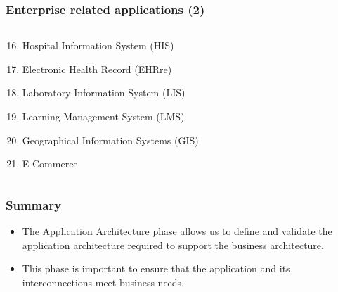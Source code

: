 \documentclass[aspectratio=169, table]{beamer}
\begin{document}
\begin{frame}
    \frametitle{Enterprise related applications (2)}
    \begin{columns}
        \begin{column}{0.5\textwidth}
            \begin{enumerate}
                \setcounter{enumi}{15}
                \item Hospital Information System (HIS)
                \item Electronic Health Record (EHRre)
                \item Laboratory Information System (LIS)
                \item Learning Management System (LMS)
                \item Geographical Information Systems (GIS)
                \item E-Commerce
            \end{enumerate}
        \end{column}
        \begin{column}{0.5\textwidth}
            \begin{center}
                \begin{enumerate}
                \end{enumerate}
            \end{center}
        \end{column}
    \end{columns}
\end{frame}

\begin{frame}
    \frametitle{Summary}
    \begin{itemize}
        \item The Application Architecture phase allows us to define and validate the application architecture required to support the business architecture.
        \item This phase is important to ensure that the application and its interconnections meet business needs.
    \end{itemize}
\end{frame}
\end{document}
